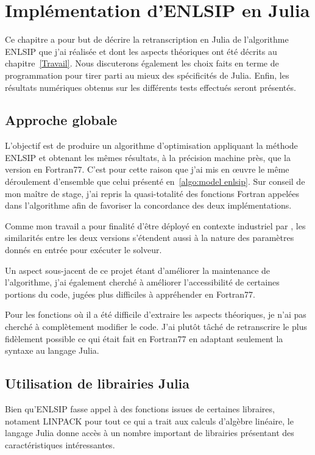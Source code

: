 \chapter{Implémentation d'ENLSIP en Julia}\label{Implementation}

Ce chapitre a pour but de décrire la retranscription en Julia de l'algorithme ENLSIP que j'ai réalisée et dont les aspects théoriques ont été décrits au 
chapitre~\ref{Travail}. Nous discuterons également les choix faits en terme de programmation pour tirer parti au mieux des spécificités de Julia. Enfin, les 
résultats numériques obtenus sur les différents tests effectués seront présentés.

\section{Approche globale}

L'objectif est de produire un algorithme d'optimisation appliquant la méthode ENLSIP et obtenant les mêmes résultats, à la précision machine près,
que la version en Fortran77. C'est pour cette raison que j'ai mis en \oe uvre le même déroulement d'ensemble que celui présenté en~\eqref{algo:model enlsip}.
Sur conseil de mon maître de stage, j'ai repris la quasi-totalité des fonctions Fortran appelées dans l'algorithme afin de favoriser la concordance des deux implémentations.

Comme mon travail a pour finalité d'être déployé en contexte industriel par \HQ, les similarités entre les deux versions s'étendent aussi
à la nature des paramètres donnés en entrée pour exécuter le solveur. 

Un aspect sous-jacent de ce projet étant d'améliorer la maintenance de l'algorithme, j'ai également cherché à améliorer l'accessibilité de certaines portions du code,
jugées plus difficiles à appréhender en Fortran77.

Pour les fonctions où il a été difficile d'extraire les aspects théoriques, je n'ai pas cherché à complètement modifier le code. J'ai plutôt tâché de retranscrire le plus 
fidèlement possible ce qui était fait en Fortran77 en adaptant seulement la syntaxe au langage Julia.

\section{Utilisation de librairies Julia}

Bien qu'ENLSIP fasse appel à des fonctions issues de certaines libraires, notament LINPACK pour tout ce qui a trait aux calculs d'algèbre linéaire, le langage Julia donne accès
à un nombre important de librairies présentant des caractéristiques intéressantes.

